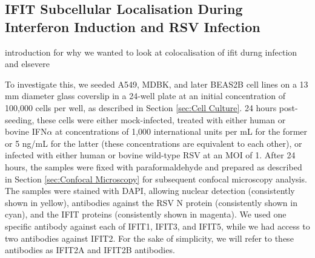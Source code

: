 \subsection{IFIT Subcellular Localisation During Interferon Induction and RSV Infection} \label{subsec:IFIT Subcellular Localisation During Interferon Induction and RSV Infection}
introduction for why we wanted to look at colocalisation of ifit durng infection and elsevere

To investigate this, we seeded A549, MDBK, and later BEAS2B cell lines on a 13 mm diameter glass coverslip in a 24-well plate at an initial concentration of 100,000 cells per well, as described in Section \ref{sec:Cell Culture}. 24 hours post-seeding, these cells were either mock-infected, treated with either human or bovine IFN\(\alpha\) at concentrations of 1,000 international units per mL for the former or 5 ng/mL for the latter (these concentrations are equivalent to each other), or infected with either human or bovine wild-type RSV at an MOI of 1. After 24 hours, the samples were fixed with paraformaldehyde and prepared as described in Section \ref{sec:Confocal Microscopy} for subsequent confocal microscopy analysis. The samples were stained with DAPI, allowing nuclear detection (consistently shown in yellow), antibodies against the RSV N protein (consistently shown in cyan), and the IFIT proteins (consistently shown in magenta). We used one specific antibody against each of IFIT1, IFIT3, and IFIT5, while we had access to two antibodies against IFIT2. For the sake of simplicity, we will refer to these antibodies as IFIT2A and IFIT2B antibodies.

